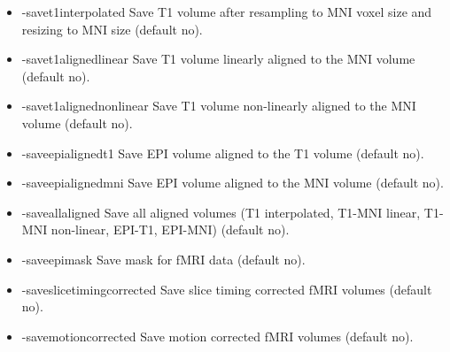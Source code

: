 \begin{itemize}

\item -savet1interpolated        
\newline \newline Save T1 volume after resampling to MNI voxel size and resizing to MNI size (default no). 

\item -savet1alignedlinear       
\newline \newline Save T1 volume linearly aligned to the MNI volume (default no). 

\item -savet1alignednonlinear    
\newline \newline Save T1 volume non-linearly aligned to the MNI volume (default no). 

\item -saveepialignedt1          
\newline \newline Save EPI volume aligned to the T1 volume (default no). 

\item -saveepialignedmni         
\newline \newline Save EPI volume aligned to the MNI volume (default no). 

\item -saveallaligned            
\newline \newline Save all aligned volumes (T1 interpolated, T1-MNI linear, T1-MNI non-linear, EPI-T1, EPI-MNI) (default no). 

\item -saveepimask               
\newline \newline Save mask for fMRI data  (default no). 

\item -saveslicetimingcorrected  
\newline \newline Save slice timing corrected fMRI volumes  (default no). 

\item -savemotioncorrected       
\newline \newline Save motion corrected fMRI volumes (default no). 


\end{itemize}
